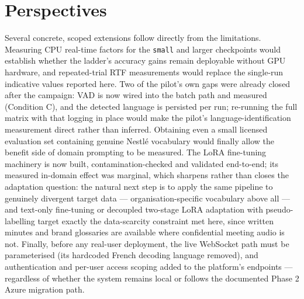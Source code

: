 \documentclass[12pt]{report}
\begin{document}
\section*{Perspectives}
Several concrete, scoped extensions follow directly from the limitations. Measuring CPU real-time factors for the \texttt{small} and larger checkpoints would establish whether the ladder's accuracy gains remain deployable without GPU hardware, and repeated-trial RTF measurements would replace the single-run indicative values reported here. Two of the pilot's own gaps were already closed after the campaign: VAD is now wired into the batch path and measured (Condition C), and the detected language is persisted per run; re-running the full matrix with that logging in place would make the pilot's language-identification measurement direct rather than inferred. Obtaining even a small licensed evaluation set containing genuine Nestl\'e vocabulary would finally allow the benefit side of domain prompting to be measured. The LoRA fine-tuning machinery is now built, contamination-checked and validated end-to-end; its measured in-domain effect was marginal, which sharpens rather than closes the adaptation question: the natural next step is to apply the same pipeline to genuinely divergent target data --- organisation-specific vocabulary above all --- and text-only fine-tuning \cite{fang2025textonly} or decoupled two-stage LoRA adaptation with pseudo-labelling \cite{zheng2026twostage} target exactly the data-scarcity constraint met here, since written minutes and brand glossaries are available where confidential meeting audio is not. Finally, before any real-user deployment, the live WebSocket path must be parameterised (its hardcoded French decoding language removed), and authentication and per-user access scoping added to the platform's endpoints --- regardless of whether the system remains local or follows the documented Phase 2 Azure migration path.
\renewcommand{\cftchappresnum}{\chaptername~}
\renewcommand{\cftchapnumwidth}{6em}
\cleardoublepage
\printbibliography[heading=subbibliography,
                    title={\textsc{Bibliography}}]
\thispagestyle{fancy}
\newpage
\tableofcontents
\thispagestyle{fancy}
\end{document}
